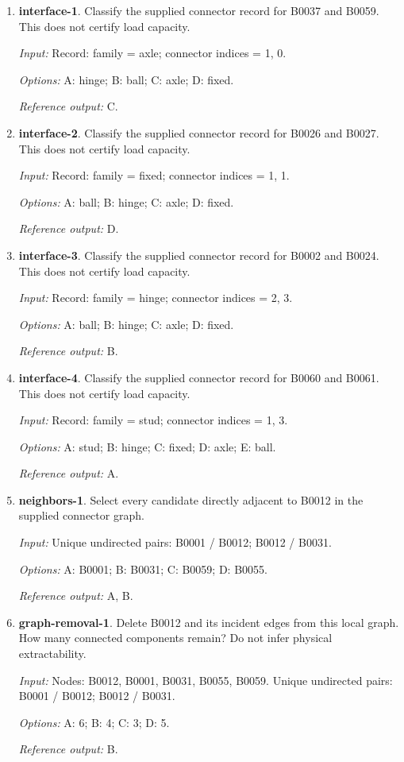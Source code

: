 \begin{enumerate}
\item \textbf{interface-1}. Classify the supplied connector record for B0037 and B0059. This does not certify load capacity.\par {\small \textit{Input:} Record: family = axle; connector indices = 1, 0. \par\textit{Options:} A: hinge; B: ball; C: axle; D: fixed. \par\textit{Reference output:} C.}
\item \textbf{interface-2}. Classify the supplied connector record for B0026 and B0027. This does not certify load capacity.\par {\small \textit{Input:} Record: family = fixed; connector indices = 1, 1. \par\textit{Options:} A: ball; B: hinge; C: axle; D: fixed. \par\textit{Reference output:} D.}
\item \textbf{interface-3}. Classify the supplied connector record for B0002 and B0024. This does not certify load capacity.\par {\small \textit{Input:} Record: family = hinge; connector indices = 2, 3. \par\textit{Options:} A: ball; B: hinge; C: axle; D: fixed. \par\textit{Reference output:} B.}
\item \textbf{interface-4}. Classify the supplied connector record for B0060 and B0061. This does not certify load capacity.\par {\small \textit{Input:} Record: family = stud; connector indices = 1, 3. \par\textit{Options:} A: stud; B: hinge; C: fixed; D: axle; E: ball. \par\textit{Reference output:} A.}
\item \textbf{neighbors-1}. Select every candidate directly adjacent to B0012 in the supplied connector graph.\par {\small \textit{Input:} Unique undirected pairs: B0001 / B0012; B0012 / B0031. \par\textit{Options:} A: B0001; B: B0031; C: B0059; D: B0055. \par\textit{Reference output:} A, B.}
\item \textbf{graph-removal-1}. Delete B0012 and its incident edges from this local graph. How many connected components remain? Do not infer physical extractability.\par {\small \textit{Input:} Nodes: B0012, B0001, B0031, B0055, B0059. Unique undirected pairs: B0001 / B0012; B0012 / B0031. \par\textit{Options:} A: 6; B: 4; C: 3; D: 5. \par\textit{Reference output:} B.}

\end{enumerate}
